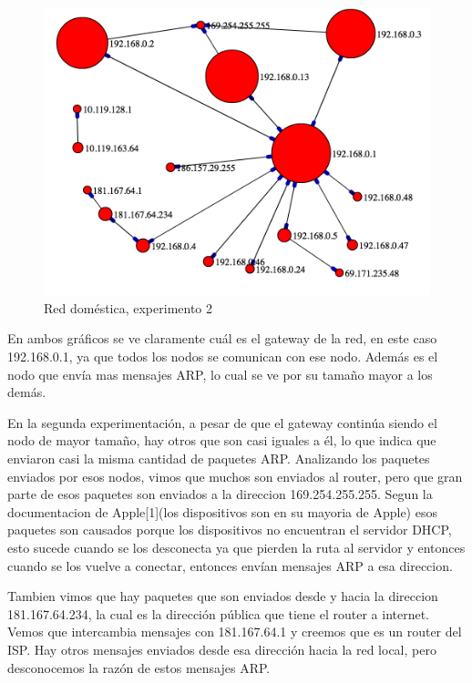 \begin{figure}[!h]
	\begin{center}
		  \includegraphics[scale=0.4]{Graficos/grafico_2.png}
		  \caption{Red doméstica, experimento 2}
		  \label{fig:contra1}
	\end{center}
\end{figure}

En ambos gráficos se ve claramente cuál es el gateway de la red, en este caso 192.168.0.1, ya que todos los nodos se comunican con ese nodo. Además es el nodo que envía mas mensajes ARP, lo cual se ve por su tama\~no mayor a los demás. 

En la segunda experimentación, a pesar de que el gateway continúa siendo el nodo de mayor tama\~no, hay otros que son casi iguales a él, lo que indica que enviaron casi la misma cantidad de paquetes ARP. Analizando los paquetes enviados por esos nodos, vimos que muchos son enviados al router, pero que gran parte de esos paquetes son enviados a la direccion 169.254.255.255. Segun la documentacion de Apple[1](los dispositivos son en su mayoria de Apple) esos paquetes son causados porque los dispositivos no encuentran el servidor DHCP, esto sucede cuando se los desconecta ya que pierden la ruta al servidor y entonces cuando se los vuelve a conectar, entonces envían mensajes ARP a esa direccion. 

Tambien vimos que hay paquetes que son enviados desde y hacia la direccion 181.167.64.234, la cual es la dirección pública que tiene el router a internet. Vemos que intercambia mensajes con  181.167.64.1 y creemos que es un router del ISP. Hay otros mensajes enviados desde esa dirección hacia la red local, pero desconocemos la razón de estos mensajes ARP. 

